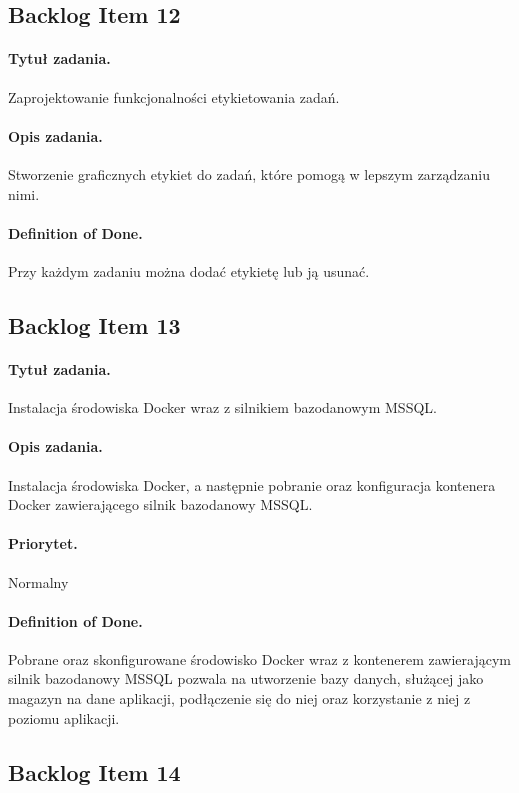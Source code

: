 \documentclass[a4paper]{article}
\begin{document}
\subsection{Backlog Item 12} 
\paragraph{Tytuł zadania.} Zaprojektowanie funkcjonalności etykietowania zadań.
\paragraph{Opis zadania.} Stworzenie graficznych etykiet do zadań, które pomogą w lepszym zarządzaniu nimi.
\paragraph{Definition of Done.} Przy każdym zadaniu można dodać etykietę lub ją usunać.






\subsection{Backlog Item 13} 
\paragraph{Tytuł zadania.}  Instalacja środowiska Docker wraz z silnikiem bazodanowym MSSQL.
\paragraph{Opis zadania.} Instalacja środowiska Docker, a następnie pobranie oraz konfiguracja kontenera Docker zawierającego silnik bazodanowy MSSQL.
\paragraph{Priorytet.} Normalny
\paragraph{Definition of Done.} Pobrane oraz skonfigurowane środowisko Docker wraz z kontenerem zawierającym silnik bazodanowy MSSQL pozwala na utworzenie bazy danych, służącej jako magazyn na dane aplikacji, podłączenie się do niej oraz korzystanie z niej z poziomu aplikacji.

\subsection{Backlog Item 14} 
\end{document}
